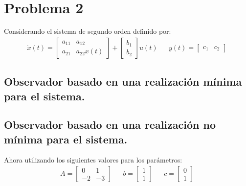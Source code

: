 \section{Problema 2}
Considerando el sistema de segundo orden definido por:
\begin{align}
    \dot{x}(t)=\begin{bmatrix}
a_{11} & a_{12}\\ 
 a_{21}& a_{22}x(t)
\end{bmatrix}+\begin{bmatrix}
b_{1}\\ 
b_{2}
\end{bmatrix}u(t)&&
y(t)=\begin{bmatrix}
c_{1}&c_{2}
\end{bmatrix}
\end{align}





\subsection{Observador basado en una realización mínima para el sistema.}

\subsection{Observador basado en una realización no mínima para el sistema.}

Ahora utilizando los siguientes valores para los parámetros:
\begin{align}
    A=\begin{bmatrix}
0&1\\ 
-2&-3
\end{bmatrix}&&b=\begin{bmatrix}
1\\ 
1
\end{bmatrix}&&c=\begin{bmatrix}
0\\ 
1
\end{bmatrix}
\end{align}
\subsection{}

\subsection{}

\subsection{}

